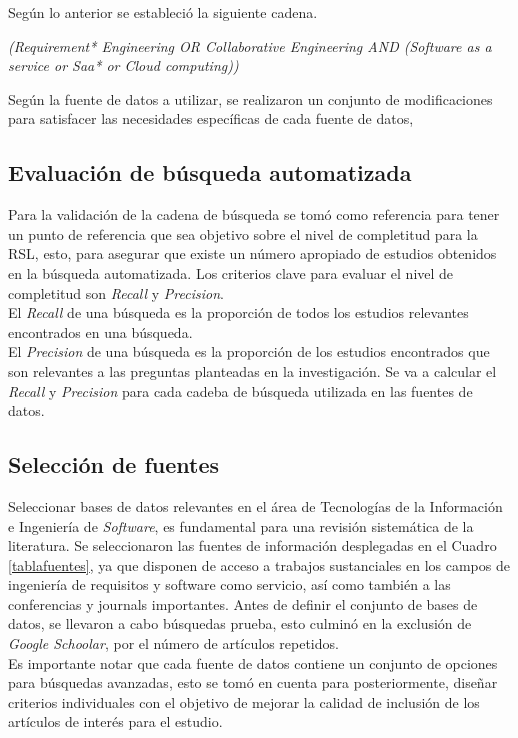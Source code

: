 \documentclass{article}
\begin{document}
Según lo anterior se estableció la siguiente cadena.

\emph{(Requirement* Engineering OR Collaborative Engineering AND (Software as a service or Saa* or Cloud computing))}

Según la fuente de datos a utilizar, se realizaron un conjunto de modificaciones para satisfacer las necesidades específicas de cada fuente de datos,


\subsection{Evaluación de búsqueda automatizada}
Para la validación de la cadena de búsqueda se tomó como referencia \cite{Evidence-Based}
para tener un punto de referencia que sea objetivo sobre el nivel de completitud para la RSL, 
esto, para asegurar que existe un número apropiado de estudios obtenidos en la búsqueda automatizada.
Los criterios clave para evaluar el nivel de completitud son \emph{Recall} y \emph{Precision}. \\ 
El \emph{Recall} de una búsqueda es la proporción de todos los estudios relevantes encontrados en una búsqueda. \\
El \emph{Precision} de una búsqueda es la proporción de los estudios encontrados que son relevantes a las preguntas 
planteadas en la investigación. 
Se va a calcular el \emph{Recall} y \emph{Precision} para cada cadeba de búsqueda utilizada en las fuentes de datos. 
\newpage


\subsection{Selección de fuentes}
Seleccionar bases de datos relevantes en el área de Tecnologías de la Información 
e Ingeniería de \emph{Software}, es fundamental para una revisión sistemática 
de la literatura.  Se seleccionaron las fuentes de información desplegadas en el Cuadro \ref{tablafuentes},
ya que disponen de acceso a trabajos sustanciales en los campos de ingeniería de requisitos y software como servicio, 
así como también a las conferencias y journals importantes. 
Antes de definir el conjunto de bases de datos, se llevaron a cabo 
búsquedas prueba, esto culminó en la exclusión  de \emph{Google Schoolar}, 
por el número de artículos repetidos.\\
Es importante notar que cada fuente de datos contiene un conjunto de opciones para búsquedas avanzadas, 
esto se tomó en cuenta para posteriormente, diseñar criterios individuales con el objetivo de mejorar la calidad de inclusión de los 
artículos de interés para el estudio.
\end{document}
